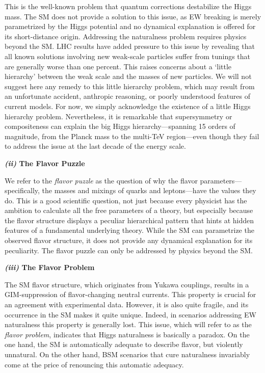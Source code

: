 \documentclass[a4paper,12pt]{article}
\begin{document}
This is the well-known problem that quantum corrections destabilize the Higgs mass. The SM does not provide a solution to this issue, as EW breaking is merely parametrized by the Higgs potential and no dynamical explanation is offered for its short-distance origin. Addressing the naturalness problem requires physics beyond the SM. LHC results have added pressure to this issue by revealing that all known solutions involving new weak-scale particles suffer from tunings that are generally worse than one percent. This raises concerns about a `little hierarchy' between the weak scale and the masses of new particles. We will not suggest here any remedy to this little hierarchy problem, which may result from an unfortunate accident, anthropic reasoning, or poorly understood features of current models. For now, we simply acknowledge the existence of a little Higgs hierarchy problem. Nevertheless, it is remarkable that supersymmetry or compositeness can explain the big Higgs hierarchy---spanning 15 orders of magnitude, from the Planck mass to the multi-TeV region---even though they fail to address the issue at the last decade of the energy scale.

\medskip
\textbf{\textit{(ii)} The Flavor Puzzle}

We refer to the {\it flavor puzzle} as the question of why the flavor parameters---specifically, the masses and mixings of quarks and leptons---have the values they do. This is a good scientific question, not just because every physicist has the ambition to calculate all the free parameters of a theory, but especially because the flavor structure displays a peculiar hierarchical pattern that hints at hidden features of a fundamental underlying theory. While the SM can parametrize the observed flavor structure, it does not provide any dynamical explanation for its peculiarity. The flavor puzzle can only be addressed by physics beyond the SM.

\medskip
\textbf{\textit{(iii)} The Flavor Problem}

The SM flavor structure, which originates from Yukawa couplings, results in a GIM-suppression of flavor-changing neutral currents. This property is crucial for an agreement with experimental data. However, it is also quite fragile, and its occurrence in the SM makes it quite unique. Indeed,
in scenarios addressing EW naturalness this property is generally lost. This issue, which will refer to  as the {\it flavor problem}, indicates that Higgs naturalness is basically a paradox. On the one hand, the SM is automatically adequate to describe flavor, but violently unnatural. On the other hand, BSM scenarios that cure naturalness invariably come at the price of renouncing this automatic adequacy.
\medskip
\end{document}
